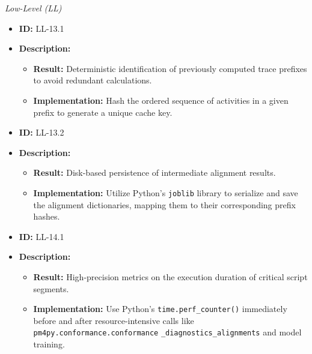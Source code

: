 \documentclass[12pt,a4paper]{article}
\begin{document}
\noindent \textit{Low-Level (LL)}

\begin{itemize}
    \item \textbf{ID:} LL-13.1
    \item \textbf{Description:}
    \begin{itemize}
        \item \textbf{Result:} Deterministic identification of previously computed trace prefixes to avoid redundant calculations.
        \item \textbf{Implementation:} Hash the ordered sequence of activities in a given prefix to generate a unique cache key.
    \end{itemize}
\end{itemize}
\vspace{1.5em}

\begin{itemize}
    \item \textbf{ID:} LL-13.2
    \item \textbf{Description:}
    \begin{itemize}
        \item \textbf{Result:} Disk-based persistence of intermediate alignment results.
        \item \textbf{Implementation:} Utilize Python's \texttt{joblib} library to serialize and save the alignment dictionaries, mapping them to their corresponding prefix hashes.
    \end{itemize}
\end{itemize}
\vspace{1.5em}

\begin{itemize}
    \item \textbf{ID:} LL-14.1
    \item \textbf{Description:}
    \begin{itemize}
        \item \textbf{Result:} High-precision metrics on the execution duration of critical script segments.
        \item \textbf{Implementation:} Use Python's \texttt{time.perf\_counter()} immediately before and after resource-intensive \linebreak calls like \texttt{pm4py.conformance.conformance} \texttt{\_diagnostics\_alignments} and model training.
    \end{itemize}
\end{itemize}
\vspace{1.5em}
\end{document}
